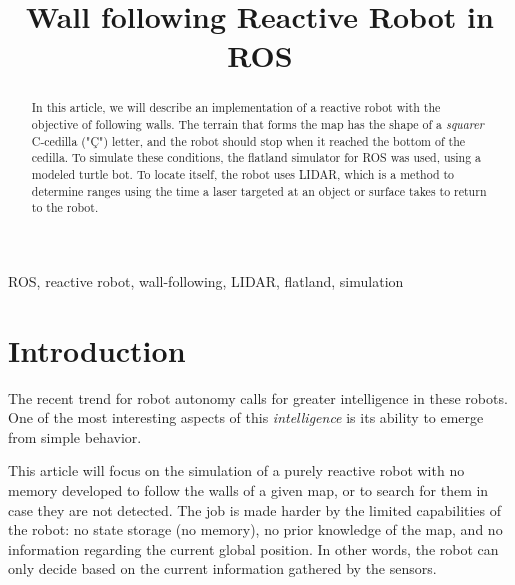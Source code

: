 \documentclass[conference]{IEEEtran}
\begin{document}
\title{Wall following Reactive Robot in ROS}

\author{
\and
{}
\and
{}

}

\maketitle

\begin{abstract}

In this article, we will describe an implementation of a reactive robot with the objective of following walls. The terrain that forms the map has the shape of a \textit{squarer} C-cedilla ("Ç") letter, and the robot should stop when it reached the bottom of the cedilla. To simulate these conditions, the flatland simulator for ROS was used, using a modeled turtle bot. To locate itself, the robot uses LIDAR, which is a method to determine ranges using the time a laser targeted at an object or surface takes to return to the robot.

\end{abstract}

\begin{IEEEkeywords}
ROS, reactive robot, wall-following, LIDAR, flatland, simulation
\end{IEEEkeywords}

\section{Introduction}

The recent trend for robot autonomy calls for greater intelligence in these robots. One of the most interesting aspects of this \textit{intelligence} is its ability to emerge from simple behavior.

This article will focus on the simulation of a purely reactive robot with no memory developed to follow the walls of a given map, or to search for them in case they are not detected. The job is made harder by the limited capabilities of the robot: no state storage (no memory), no prior knowledge of the map, and no information regarding the current global position. In other words, the robot can only decide based on the current information gathered by the sensors.
\end{document}
